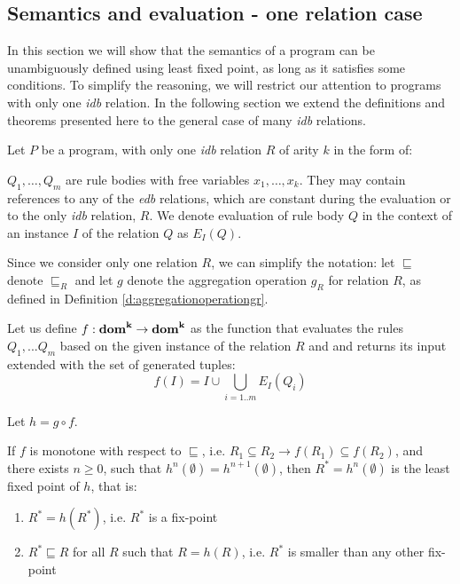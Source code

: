 \subsection{Semantics and evaluation - one relation case}\label{ss:semeval1rel}
In this section we will show that the semantics of a \datalogra program can be unambiguously defined using least fixed point, as long as it satisfies some conditions. To simplify the reasoning, we will restrict our attention to programs with only one \emph{idb} relation. In the following section we extend the definitions and theorems presented here to the general case of many \emph{idb} relations.

Let $P$ be a \datalogra program, with only one \emph{idb} relation $R$ of arity $k$ in the form of:

\begin{figure}[h!]
\end{figure}

$Q_1, \dots, Q_m$ are rule bodies with free variables $x_1, \dots, x_k$. They may contain references to any of the \emph{edb} relations, which are constant during the evaluation or to the only \emph{idb} relation, $R$. We denote evaluation of rule body $Q$ in the context of an instance $I$ of the relation $Q$ as $E_I(Q)$.

Since we consider only one relation $R$, we can simplify the notation: let $\sqsubseteq$ denote $\sqsubseteq_R$ and let $g$ denote the aggregation operation $g_R$ for relation $R$, as defined in Definition \ref{d:aggregationoperationgr}.

Let us define $f: \bf{dom}^k \to \bf{dom}^k$ as the function that evaluates the rules $Q_1, ... Q_m$ based on the given instance of the relation $R$ and and returns its input extended with the set of generated tuples:
$$ f(I) = I \cup \bigcup_{i=1..m} E_I(Q_i) $$

Let $h = g \circ f$. 


\begin{thm}
If $f$ is monotone with respect to $\sqsubseteq$, i.e. $R_1 \subseteq R_2 \rightarrow f(R_1) \subseteq f(R_2)$, and there exists $n \ge 0 $, such that $h^n(\emptyset) = h^{n+1}(\emptyset)$, then $R^* = h^n(\emptyset)$ is the least fixed point of $h$, that is:
\begin{enumerate}
\item $R^* = h(R^*)$, i.e. $R^*$ is a fix-point
\item $R^* \sqsubseteq R$ for all $R$ such that $R = h(R)$, i.e. $R^*$ is smaller than any other fix-point
\end{enumerate}
\end{thm}


